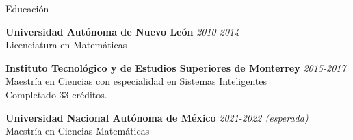 \documentclass{resume} %
\begin{document}

\begin{rSection}{Educación}

{\bf Universidad Autónoma de Nuevo León} \hfill {\em 2010-2014} \\ 
Licenciatura en Matemáticas
\smallskip 

{\bf Instituto Tecnológico y de Estudios Superiores de Monterrey} \hfill {\em 2015-2017} \\
Maestría en Ciencias con especialidad en Sistemas Inteligentes\\
Completado 33 créditos.  \smallskip

{\bf Universidad Nacional Autónoma de México} \hfill {\em 2021-2022 (esperada)} \\
Maestría en Ciencias Matemáticas
\end{rSection}

\end{document}

